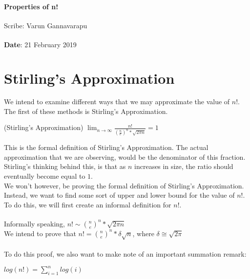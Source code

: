 \documentclass[11pt,twosided]{article}
\def\titlestring{Properties of n!}
\def\scribestring{Varun Gannavarapu}
\def\datestring{21 February 2019}
\begin{document}
\thispagestyle{plain}  %

\noindent
{\LARGE \textbf{\titlestring}}\\\\
%
{\Large Scribe: \scribestring}\\ \\
{\textbf{Date}: \datestring}


\noindent

\section{Stirling's Approximation}
We intend to examine different ways that we may approximate the value of $n!$. The first of these methods is Stirling's Approximation.\\
\begin{theorem}
    (Stirling's Approximation) $\lim_{n\to\infty} \frac{n!}{(\frac{n}{e})^n * \sqrt{2\pi n}} = 1$
\end{theorem}
This is the formal definition of Stirling's Approximation. The actual approximation that we are observing, would be the denominator of this fraction. Stirling's thinking behind this, is that as $n$ increases in size, the ratio should eventually become equal to $1$.\\
We won't however, be proving the formal definition of Stirling's Approximation. Instead, we want to find some sort of upper and lower bound for the value of $n!$. To do this, we will first create an informal definition for $n!$.\\
\\
Informally speaking, $n! \sim {n \choose e}^n * \sqrt{2\pi n}$\\
We intend to prove that $n! = {n \choose e}^n * \delta \sqrt{n}$, where $\delta \cong \sqrt{2\pi}$\\
\\
To do this proof, we also want to make note of an important summation remark:
\begin{remark}
    $log(n!) = \sum_{i=1}^{n} {log(i)}$\\
\end{remark}
\end{document}
